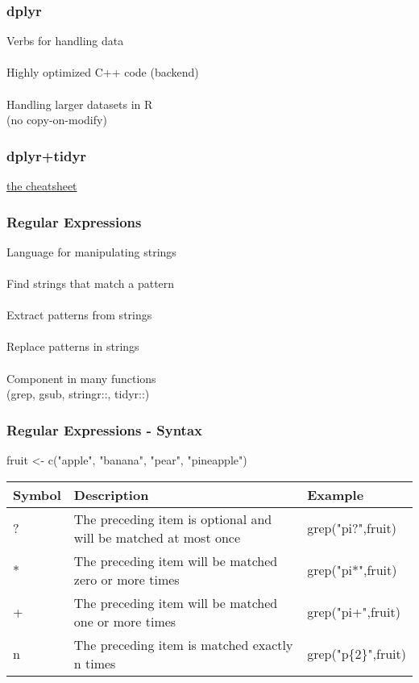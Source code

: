\documentclass{beamer}
\begin{document}
\begin{frame}
	\frametitle{dplyr}
	\begin{center}
		\begin{enumerate}
			Verbs for handling data\\~\\
			Highly optimized C++ code (backend)\\~\\
			Handling larger datasets in R\\
			(no copy-on-modify)
		\end{enumerate}
	\end{center}
\end{frame}

\begin{frame}
	\frametitle{dplyr+tidyr}
	\begin{center}
		\href{https://www.rstudio.com/wp-content/uploads/2015/02/data-wrangling-cheatsheet.pdf}
		{the cheatsheet}
	\end{center}
\end{frame}

\begin{frame}
	\frametitle{Regular Expressions}
	\begin{center}
		Language for manipulating strings\\~\\
		Find strings that match a pattern\\~\\
		Extract patterns from strings\\~\\
		Replace patterns in strings\\~\\
		Component in many functions\\
		(grep, gsub, stringr::, tidyr::)
	\end{center}
\end{frame}

\begin{frame}
	\frametitle{Regular Expressions - Syntax}
	\begin{center}
		fruit \textless- c("apple", "banana", "pear", "pineapple")
			\begin{table}
				\begin{tabular}{p{1.5cm} | p{4.5cm} | p{2cm}}
					\textbf{Symbol} & \textbf{Description} & \textbf{Example}\\
					\hline
					? & The preceding item is optional and will be matched at 
					most once & grep("pi?",fruit) \\
					\hline
					* & The preceding item will be matched zero or more times & 
					grep("pi*",fruit) \\
					\hline
					+ & The preceding item will be matched one or more times & 
					grep("pi+",fruit) \\
					\hline
					{n} & The preceding item is matched exactly n times & 
					grep("p\{2\}",fruit) \\
				\end{tabular}
			\end{table}
	\end{center}
\end{frame}
\end{document}
